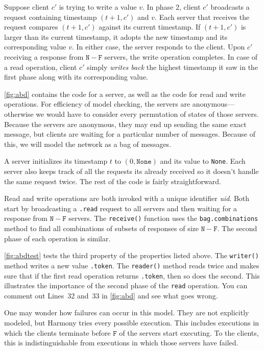 \documentclass{report}
\begin{document}
Suppose client $c'$ is trying to write a value $v$.
In phase 2, client $c'$ broadcasts a request containing timestamp $(t+1, c')$
and $v$.  Each server that receives the request compares $(t+1, c')$ against
its current timestamp.  If $(t+1, c')$ is larger than its current timestamp,
it adopts the new timestamp and its corresponding value $v$.  In either case,
the server responds to the client.
Upon $c'$ receiving a response from $\mathtt{N} - \mathtt{F}$ servers,
the write operation completes.
In case of a read operation, client $c'$ simply \emph{writes back} the
highest timestamp it saw in the first phase along with its corresponding value.

\autoref{fig:abd} contains the code for a server, as well as the code
for read and write operations.
For efficiency of model checking, the servers are anonymous---otherwise
we would have to consider every permutation of states of those servers.
Because the servers are anonymous, they may end up sending the same
exact message, but clients are waiting for a particular number of
messages.
Because of this, we will model the network as a bag of messages.

A server initializes its timestamp $t$ to
$(0, \mathtt{None})$ and its value to \texttt{None}.
Each server also keeps track of all the requests its already received
so it doesn't handle the same request twice.
The rest of the code is fairly straightforward.

Read and write operations are both invoked with a unique identifier
\textit{uid}.  Both start by broadcasting a \texttt{.read}
request to all servers and then waiting for a response from
$\mathtt{N} - \mathtt{F}$ servers.
The \texttt{receive()} function uses the \texttt{bag.combinations} method
to find all combinations of subsets of responses of size
$\mathtt{N} - \mathtt{F}$.
The second phase of each operation is similar.

\autoref{fig:abdtest} tests the third property of the properties listed
above.  The \texttt{writer()} method writes a new value \texttt{.token}.
The \texttt{reader()} method reads twice and makes sure that if the
first read operation returns \texttt{.token}, then so does the second.
This illustrates the importance of the second phase of the \texttt{read}
operation.  You can comment out Lines~32 and~33 in \autoref{fig:abd} and
see what goes wrong.

One may wonder how failures can occur in this model.  They are not
explicitly modeled, but Harmony tries every possible execution.
This includes executions in which the clients terminate before
$\texttt{F}$ of the servers start executing.  To the clients, this
is indistinguishable from executions in which those
servers have failed.
\end{document}
